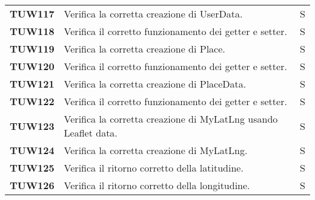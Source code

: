 \documentclass[../../piano-di-qualifica.tex]{subfiles}
\begin{document}
\begin{longtable}[H]{>{\centering\bfseries}m{3cm} >{}m{10cm} >{\centering\arraybackslash}m{3cm}}
  TUW117             & Verifica la corretta creazione di UserData.                                                                         & S                             \\

  TUW118             & Verifica il corretto funzionamento dei getter e setter.                                                             & S                             \\


  TUW119             & Verifica la corretta creazione di Place.                                                                            & S                             \\

  TUW120             & Verifica il corretto funzionamento dei getter e setter.                                                             & S                             \\


  TUW121             & Verifica la corretta creazione di PlaceData.                                                                        & S                             \\

  TUW122             & Verifica il corretto funzionamento dei getter e setter.                                                             & S                             \\


  TUW123             & Verifica la corretta creazione di MyLatLng usando Leaflet data.                                                     & S                             \\

  TUW124             & Verifica la corretta creazione di MyLatLng.                                                                         & S                             \\

  TUW125             & Verifica il ritorno corretto della latitudine.                                                                      & S                             \\

  TUW126             & Verifica il ritorno corretto della longitudine.                                                                     & S                             \\


\end{longtable}
\end{document}
